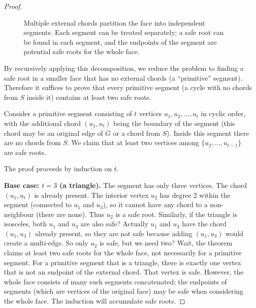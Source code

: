 \begin{proof}
    \begin{figure}[htbp]
        \centering
        \caption{Multiple external chords partition the face into independent segments. 
        Each segment can be treated separately; a safe root can be found in each segment, and the endpoints of the segment are potential safe roots for the whole face.}
        \label{fig:partition}
    \end{figure}

    By recursively applying this decomposition, we reduce the problem to finding a safe root in a smaller face that has no external chords (a ``primitive'' segment). 
    Therefore it suffices to prove that every primitive segment (a cycle with no chords from \(S\) inside it) contains at least two safe roots.

    Consider a primitive segment consisting of \(t\) vertices \(u_1, u_2, \dots, u_t\) in cyclic order, with the additional chord \((u_1, u_t)\) being the boundary of the segment (this chord may be an original edge of \(G\) or a chord from \(S\)). 
    Inside this segment there are no chords from \(S\). 
    We claim that at least two vertices among \(\{u_2, \dots, u_{t-1}\}\) are safe roots.

    The proof proceeds by induction on \(t\).

    \noindent\textbf{Base case: \(t = 3\) (a triangle).} 
    The segment has only three vertices. 
    The chord \((u_1, u_t)\) is already present. 
    The interior vertex \(u_2\) has degree 2 within the segment (connected to \(u_1\) and \(u_3\)), so it cannot have any chord to a non-neighbour (there are none). 
    Thus \(u_2\) is a safe root. 
    Similarly, if the triangle is isosceles, both \(u_1\) and \(u_3\) are also safe? Actually \(u_1\) and \(u_3\) have the chord \((u_1, u_3)\) already present, so they are not safe because adding \((u_1, u_3)\) would create a multi-edge. 
    So only \(u_2\) is safe, but we need two? Wait, the theorem claims at least two safe roots for the whole face, not necessarily for a primitive segment. 
    For a primitive segment that is a triangle, there is exactly one vertex that is not an endpoint of the external chord. 
    That vertex is safe. 
    However, the whole face consists of many such segments concatenated; the endpoints of segments (which are vertices of the original face) may be safe when considering the whole face. 
    The induction will accumulate safe roots.


\end{proof}
